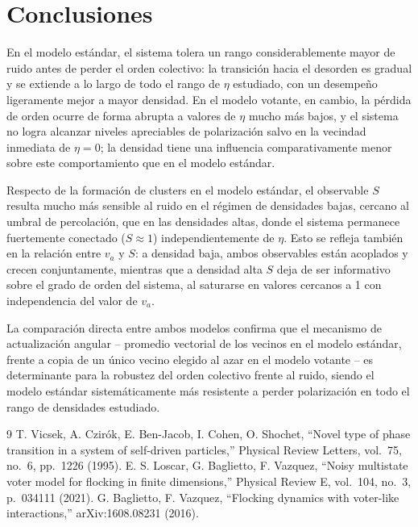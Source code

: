 \documentclass[a4paper,11pt]{article}
\begin{document}
\section{Conclusiones}
\label{sec:conclusiones}

En el modelo estándar, el sistema tolera un rango considerablemente mayor de
ruido antes de perder el orden colectivo: la transición hacia el desorden es
gradual y se extiende a lo largo de todo el rango de $\eta$ estudiado, con
un desempeño ligeramente mejor a mayor densidad. En el modelo votante, en
cambio, la pérdida de orden ocurre de forma abrupta a valores de $\eta$
mucho más bajos, y el sistema no logra alcanzar niveles apreciables de
polarización salvo en la vecindad inmediata de $\eta=0$; la densidad tiene
una influencia comparativamente menor sobre este comportamiento que en el
modelo estándar.

Respecto de la formación de clusters en el modelo estándar, el observable
$S$ resulta mucho más sensible al ruido en el régimen de densidades bajas, cercano al umbral de
percolación, que en las densidades altas, donde el sistema permanece
fuertemente conectado ($S\approx1$) independientemente de $\eta$. Esto se
refleja también en la relación entre $v_a$ y $S$: a densidad baja, ambos
observables están acoplados y crecen conjuntamente, mientras que a densidad
alta $S$ deja de ser informativo sobre el grado de orden del sistema, al
saturarse en valores cercanos a 1 con independencia del valor de $v_a$.

La comparación directa entre ambos modelos confirma que el mecanismo de
actualización angular -- promedio vectorial de los vecinos en el modelo
estándar, frente a copia de un único vecino elegido al azar en el modelo
votante -- es determinante para la robustez del orden colectivo frente al
ruido, siendo el modelo estándar sistemáticamente más resistente a perder
polarización en todo el rango de densidades estudiado.

\renewcommand{\refname}{Referencias}
\begin{thebibliography}{9}
   T. Vicsek, A. Czirók, E. Ben-Jacob, I. Cohen, O. Shochet, ``Novel type of phase transition in a system of self-driven particles,'' Physical Review Letters, vol.~75, no.~6, pp.~1226 (1995).
   E. S. Loscar, G. Baglietto, F. Vazquez, ``Noisy multistate voter model for flocking in finite dimensions,'' Physical Review E, vol.~104, no.~3, p.~034111 (2021).
   G. Baglietto, F. Vazquez, ``Flocking dynamics with voter-like interactions,'' arXiv:1608.08231 (2016).
\end{thebibliography}
\end{document}
